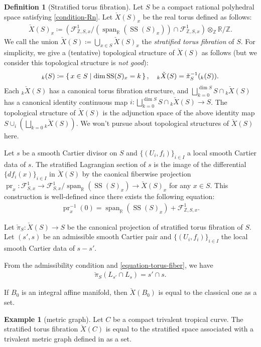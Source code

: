 \documentclass[a4paper,dvipdfmx,reqno,12pt]{amsart}
\theoremstyle{definition}
\newtheorem{definition}[theorem]{Definition}
\newtheorem{example}[theorem]{Example}
\newcommand{\deq}{\coloneqq}
\newcommand{\Z}{\mathbb{Z}}%
\newcommand{\opn}[1]{\operatorname{#1}}
\numberwithin{equation}{section}
\begin{document}
\begin{definition}[{Stratified torus fibration}]
Let $S$ be a compact rational polyhedral space 
satisfying \cref{condition-Rn}.
Let $\check{X}(S)_x$ be 
the real torus defined as follows:
\begin{align}
\check{X}(S)_x\deq  
(\mathcal{F}_{\mathbb{Z},S,x}^{1}/(\opn{span}_{{\mathbb{R}}}
(\opn{SS}(S)_x))\cap \mathcal{F}_{\mathbb{Z},S,x}^{1})\otimes_{\Z} {\mathbb{R}}/\Z.
\end{align}
We call the union $\check{X}(S)\deq \bigcup_{x\in S}\check{X}(S)_x$
the \emph{stratified torus 
fibration} of $S$.
For simplicity, we give a (tentative) 
topological structure of $\check{X}(S)$ as follows
(but we consider this topological structure is 
\emph{not good}):
\begin{align}
{}_k(S)\deq \set{x\in S\mid \dim \opn{SS}(S)_x=k}, \quad
{}_k\check{X}(S)=\check{\pi}_{S}^{-1}({}_k(S)).
\end{align}
Each ${}_k\check{X}(S)$ has a canonical torus fibration 
structure, and
$\bigsqcup_{k=0}^{\dim S} S\cap {}_k\check{X}(S)$ has 
a canonical identity continuous map 
$i\colon \bigsqcup_{k=0}^{\dim S} S\cap {}_k\check{X}(S)
\to S$.
The topological structure of $\check{X}(S)$ is 
the adjunction space of the above identity map
$S \cup_{i} (\bigsqcup_{k=0} {}_k\check{X}(S))$.
We won't pursue about
topological structures of $\check{X}(S)$ 
here.

Let $s$ be a smooth 
Cartier divisor on $S$ and $\{(U_i,f_i)\}_{i\in I}$ a local
smooth Cartier data of $s$. 
The stratified Lagrangian section of $s$ is the image of the 
differential  $\{df_i(x)\}_{i\in I}$ in $\check{X}(S)$
by the caonical fiberwise projection 
$\opn{pr}_x\colon \mathcal{F}_{S,x}^{1}
\to \mathcal{F}_{S,x}^{1}/\opn{span}_{\mathbb{R}}(\opn{SS}(S)_x) \to \check{X}(S)_x$ for any $x\in S$.
This construction is well-defined since there exists 
the following equation: 
\begin{align}
\label{equation-torus-fiber}
\opn{pr}_x^{-1}(0)
=\opn{span}_{\mathbb{R}}(\opn{SS}(S)_x)+
\mathcal{F}^{1}_{\mathbb{Z},S,x}.
\end{align}

Let $\check{\pi}_S\colon \check{X}(S)\to S$ be the 
canonical projection of stratified torus fibration of $S$.
Let $(s',s)$ be an admissible smooth Cartier pair and 
$\{(U_i,f_i)\}_{i\in I}$ the local smooth Cartier data of $s-s'$.

From the admissibility condition and
\cref{equation-torus-fiber}, we have
\begin{align}
\check{\pi}_S(L_{s'}\cap L_s)=s'\cap s.
\end{align}
\end{definition}
If $B_0$ is an integral affine manifold, then
$\check{X}(B_0)$ is equal to the classical one as a set. 
\begin{example}[{metric graph}]
Let $C$ be a compact trivalent tropical curve.
The stratified torus fibration $\check{X}(C)$ is equal to 
the stratified space associated
with a trivalent metric graph defined in \cite{auroux2022lagrangian}
as a set.
\end{example}
\end{document}
